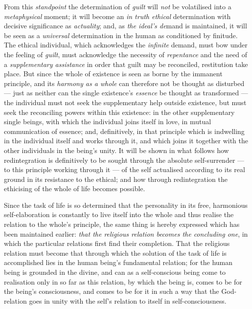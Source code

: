 \documentclass[12pt,a4paper]{book}
\begin{document}
From this \emph{standpoint} the determination of \emph{guilt} will \emph{not}
be volatilised into a \emph{metaphysical} moment; it will become an \emph{in
truth ethical} determination with decisive significance as \emph{actuality};
and, as \emph{the ideal's de}mand is maintained, it will be seen as a
\emph{universal} determination in the human as conditioned by finitude. The
ethical individual, which acknowledges the \emph{infinite} demand, must bow
under the feeling of \emph{guilt}, must acknowledge the necessity of
\emph{repentance} and the need of a \emph{supplementary assistance} in order
that guilt may be reconciled, restitution take place. But since the whole of
existence is seen as borne by the immanent principle, and its \emph{harmony as
a whole} can therefore not be thought as disturbed --- just as neither can the
single existence's \emph{essence} be thought as transformed --- the individual
must not seek the supplementary help outside existence, but must seek the
reconciling powers within this existence: in the other supplementary single
beings, with which the individual joins itself in love, in mutual
communication of essence; and, definitively, in that principle which is
indwelling in the individual itself and works through it, and which joins it
together with the other individuals in the being's unity. It will be shown in
what follows how
redintegration is definitively to be sought through the absolute self-surrender
--- to this principle working through it --- of the self actualised according
to its real ground in its resistance to the ethical; and how through
redintegration the ethicising of the whole of life becomes possible.

Since the task of life is so determined that the personality in its free,
harmonious self-elaboration is constantly to live itself into the whole and
thus realise the relation to the whole's principle, the same thing is hereby
expressed which has been maintained earlier: \emph{that the religious relation
becomes the concluding one}, in which the particular relations first find
their completion. That the religious relation must become that through which
the solution of the task of life is accomplished lies in the human being's
fundamental relation; for the human being is grounded in the divine, and can
as a self-conscious being come to realisation only in so far as this relation,
by which the being is, comes to be for the being's consciousness, and comes to
be for it in such a way that the God-relation goes in unity with the self's
relation to itself in self-consciousness.
\end{document}
